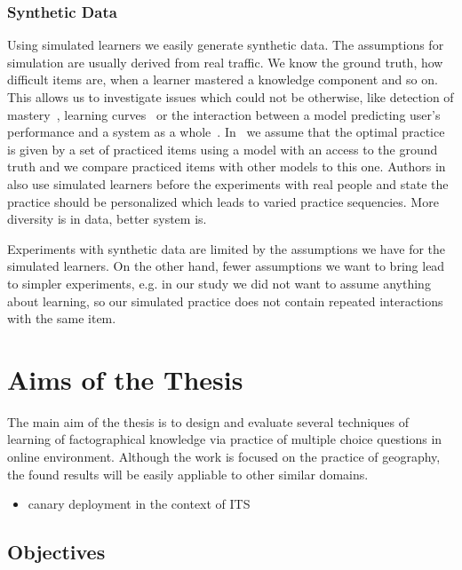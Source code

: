 \documentclass[table,color]{fithesis3/fithesis3}
\begin{document}
\subsection{Synthetic Data}

Using simulated learners we easily generate synthetic data. The assumptions for
simulation are usually derived from real traffic. We know the ground truth, how
difficult items are, when a learner mastered a knowledge component and so on.
This allows us to investigate issues which could not be otherwise, like
detection of mastery~\cite{fancsali2013optimal}, learning
curves~\cite{fancsali2013simulated} or the interaction between a model
predicting user's performance and a system as a
whole~\cite{niznan2015exploring}. In~\cite{niznan2015exploring} we assume that
the optimal practice is given by a set of practiced items using a model with an
access to the ground truth and we compare practiced items with other models to
this one. Authors in~\cite{lopes2015multi} also use simulated learners before
the experiments with real people and state the practice should be personalized
which leads to varied practice sequencies. More diversity is in data, better
system is.

Experiments with synthetic data are limited by the assumptions we have for the
simulated learners. On the other hand, fewer assumptions we want to bring lead
to simpler experiments, e.g. in our study we did not want to assume anything
about learning, so our simulated practice does not contain repeated
interactions with the same item.

\chapter{Aims of the Thesis}

The main aim of the thesis is to design and evaluate several techniques of
learning of factographical knowledge via practice of multiple choice questions in
online environment. Although the work is focused on the practice of geography,
the found results will be easily appliable to other similar domains.

\begin{itemize}
	\item canary deployment in the context of ITS
\end{itemize}

\section{Objectives}
\end{document}
